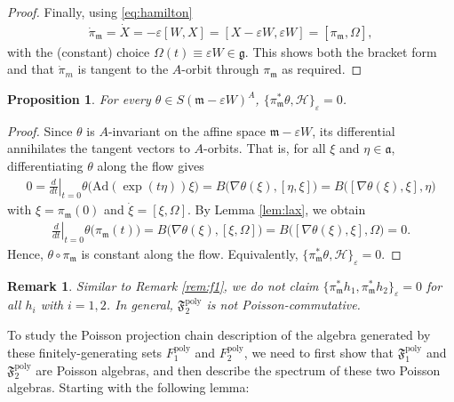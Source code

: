 \documentclass[11pt]{amsart}
\newtheorem{proposition}[theorem]{Proposition}
\theoremstyle{definition}
\theoremstyle{plain}
\newtheorem{remark}[theorem]{Remark}
\theoremstyle{conclusion}
\begin{document}
\begin{proof}
Finally, using \eqref{eq:hamilton}
\begin{align*}
\dot{\pi}_\mathfrak{m} =\dot{X}=-\varepsilon[W,X]=[X-\varepsilon W,\varepsilon W]=[\pi_\mathfrak{m}, \Omega],
\end{align*} with the (constant) choice $\Omega(t)\equiv \varepsilon W \in \mathfrak{g}$. This shows both the bracket form and that $\dot{\pi}_m$ is tangent to the $A$-orbit through $\pi_\mathfrak{m}$ as required.
\end{proof}
 

\begin{proposition}
\label{prop:rightintegrals}
For every $\theta\in S(\mathfrak{m}-\varepsilon W)^A$,  $ \{ \pi_{\mathfrak{m}}^*\theta, \mathcal{H}\}_\varepsilon = 0$. 
\end{proposition}

\begin{proof}
Since $\theta$ is $A$-invariant on the affine space $\mathfrak{m}-\varepsilon W$, its differential annihilates the tangent vectors to $A$-orbits. That is, for all $\xi$ and $\eta\in\mathfrak{a}$, differentiating $\theta$ along the flow gives \begin{align*}
0=\left.\frac{d}{dt}\right\vert_{t =0} \theta\big(\mathrm{Ad}(\exp(t\eta))\xi\big) = B\big(\nabla \theta(\xi),[\eta,\xi]\big)=B\big([\nabla \theta(\xi),\xi],\eta\big) 
\end{align*} with $\xi=\pi_{\mathfrak{m}}(0)$ and $\dot\xi=[\xi,\Omega]$. By Lemma \ref{lem:lax}, we obtain \begin{align*}
\left.\frac{d}{dt}\right\vert_{t= 0}\theta\big(\pi_{\mathfrak{m}}(t)\big) = B\big(\nabla \theta(\xi),[\xi,\Omega]\big)=B\big([\nabla \theta(\xi),\xi],\Omega\big)=0.
\end{align*} Hence, $\theta\circ\pi_{\mathfrak{m}}$ is constant along the flow. Equivalently, $\{\pi_{\mathfrak{m}}^*\theta,\mathcal{H}\}_\varepsilon=0$.
\end{proof}

\begin{remark}
Similar to Remark \ref{rem:f1}, we do \emph{not} claim  $\{\pi_{\mathfrak{m}}^*h_1,\pi_{\mathfrak{m}}^*h_2\}_\varepsilon=0$ for all $h_i$ with $i = 1,2$. In general, $\mathfrak{F}_2^{\mathrm{poly}}$ is not Poisson-commutative.
\end{remark}

To study the Poisson projection chain description of the algebra generated by these finitely-generating sets $F_1^{\mathrm{poly}}$ and $F_2^{\mathrm{poly}}$, we need to first show that $\mathfrak{F}_1^{\mathrm{poly}}$ and $\mathfrak{F}_2^{\mathrm{poly}}$ are Poisson algebras, and then describe the spectrum of these two Poisson algebras. Starting with the following lemma:
\end{document}
